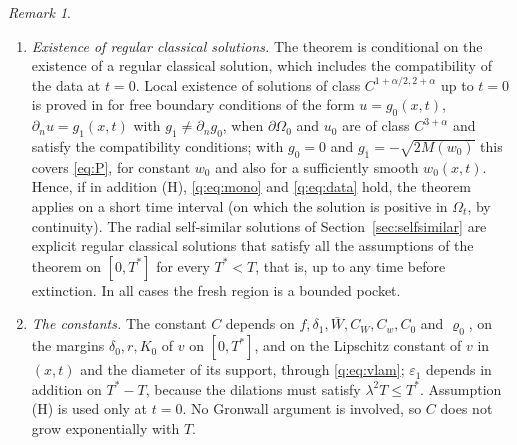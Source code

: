\documentclass[11pt]{amsart}
\theoremstyle{definition}
\theoremstyle{remark}
\newtheorem{remark}[theorem]{Remark}
\newcommand{\ve}{\varepsilon}
\begin{document}
\begin{remark}
\begin{enumerate}
at the points of $\{v=0\}$ at distance at least $C(\ve\log(1/\ve)+\eta_\ve)$ from the free
boundary.
There $u^\ve-v=-\ve W^\ve+O(\ve^2)$, so the order $\ve$ cannot be improved in the sup norm
when $w_0\not\equiv0$. This difference is the offset between the temperature of the burnt
gas, $T_f+\ve w_0$, and the reference $T_f$; when $w_0\equiv0$ it gives no information, and
a more significant quantity is the position of the front. For it we only have the example
of the travelling waves of Section~\ref{sec:tw}, which are not covered by the theorem,
since their fresh region is not bounded. By Proposition~\ref{prop:speed},
$c_\ve-c_0=\beta\,\ve+O(\ve^2)$ with $\beta=\frac{c_0}A\big(1-\frac I{\sqrt{2M}}\big)$, which is not
zero in general (for $f(s)=(1-s)^+$ it vanishes only for $w_0=w_0^*$). Hence the distance
travelled in a time $t$ by any level set of $u^\ve$ differs from that of the free
boundary by $\beta\,\ve\,t+O(\ve^2t)$, whatever level is used to define the front. In
addition, at each time the front $\{u^\ve=\ve\}$ is ahead of the free boundary of the
outer solution: for $z\ge0$, $\Phi_\ve(z)=A(1-e^{-c_\ve(z-z_\ve)})$ with
$z_\ve=\log(1-\ve/A)/c_\ve=-\ve/\sqrt{2M}+O(\ve^2)$; this shift depends on the level that
defines the front, and it is observed for general data in Section~\ref{sec:limit}.
\item \emph{Existence of regular classical solutions.} The theorem is conditional on
the existence of a regular classical solution, which includes the compatibility of the
data at $t=0$. Local existence of solutions of class $C^{1+\alpha/2,2+\alpha}$
up to $t=0$ is proved in \cite[Theorem~2.8]{BaconneauLunardi2004} for free boundary
conditions of the form $u=g_0(x,t)$, $\partial_nu=g_1(x,t)$ with $g_1\ne\partial_ng_0$, when
$\partial\Omega_0$ and $u_0$ are of class $C^{3+\alpha}$ and satisfy the compatibility
conditions; with $g_0=0$ and $g_1=-\sqrt{2M(w_0)}$ this covers \eqref{eq:P}, for constant
$w_0$ and also for a sufficiently smooth $w_0(x,t)$. Hence, if in addition (H),
\eqref{q:eq:mono} and \eqref{q:eq:data} hold, the theorem applies on a short time
interval (on which the solution is positive in $\Omega_t$, by continuity). The radial
self-similar solutions of Section~\ref{sec:selfsimilar} are
explicit regular classical solutions that satisfy all the assumptions of the theorem
on $[0,T^*]$ for every $T^*<T$, that is, up to any time before extinction. In all cases
the fresh region is a bounded pocket.
\item \emph{The constants.} The constant $C$ depends on $f,\delta_1,\bar W,C_W,C_w,C_0$ and
$\varrho_0$, on the margins $\delta_0,r,K_0$ of $v$ on $[0,T^*]$, and on the Lipschitz constant
of $v$ in $(x,t)$ and the diameter of its support, through \eqref{q:eq:vlam}; $\ve_1$
depends in addition on $T^*-T$, because the dilations must satisfy $\lambda^2T\le T^*$.
Assumption (H) is used only at $t=0$. No Gronwall argument is involved, so $C$ does not
grow exponentially with $T$.
\end{enumerate}
\end{remark}
\end{document}
